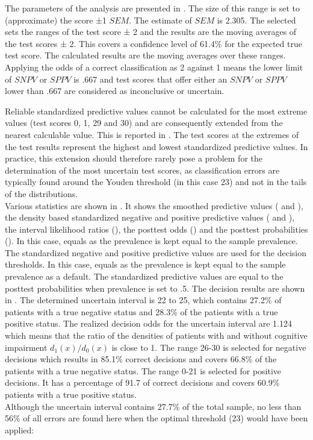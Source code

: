 \documentclass[
  nojss]{jss}
\begin{document}
The parameters of the analysis are presented in . The
size of this range is set to (approximate) the score ±1 \(SEM\). The
estimate of \(SEM\) is 2.305. The selected  sets
the ranges of the test score ± 2 and the results are the moving averages
of the test scores ± 2. This covers a confidence level of 61.4\% for the
expected true test score. The calculated results are the moving averages
over these ranges. Applying the odds of a correct classification as 2
against 1 means the lower limit of \(SNPV\) or \(SPPV\) is .667 and test
scores that offer either an \(SNPV\) or \(SPPV\) lower than .667 are
considered as inconclusive or uncertain.

Reliable standardized predictive values cannot be calculated for the
most extreme values (test scores 0, 1, 29 and 30) and are consequently
extended from the nearest calculable value. This is reported in
. The test scores at the extremes of the test results
represent the highest and lowest standardized predictive values. In
practice, this extension should therefore rarely pose a problem for the
determination of the most uncertain test scores, as classification
errors are typically found around the Youden threshold (in this case 23)
and not in the tails of the distributions.\\
Various statistics are shown in . It shows the
smoothed predictive values ( and ), the density
based standardized negative and positive predictive values (
and ), the interval likelihood ratios (), the
posttest odds () and the posttest probabilities
(). In this case,  equals  as
the prevalence is kept equal to the sample prevalence.\\
The standardized negative and positive predictive values are used for
the decision thresholds. In this case,  equals
 as the prevalence is kept equal to the sample prevalence as
a default. The standardized predictive values are equal to the posttest
probabilities when prevalence is set to .5. The decision results are
shown in . The determined uncertain interval is 22 to 25,
which contains 27.2\% of patients with a true negative status and 28.3\%
of the patients with a true positive status. The realized decision odds
for the uncertain interval are 1.124 which means that the ratio of the
densities of patients with and without cognitive impairment
\(d_1(x) / d_0(x)\) is close to 1. The range 26-30 is selected for
negative decisions which results in 85.1\% correct decisions and covers
66.8\% of the patients with a true negative status. The range 0-21 is
selected for positive decisions. It has a percentage of 91.7 of correct
decisions and covers 60.9\% patients with a true positive status.\\
Although the uncertain interval contains 27.7\% of the total sample, no
less than 56\% of all errors are found here when the optimal threshold
(23) would have been applied:
\end{document}
